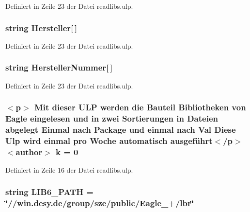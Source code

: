 Definiert in Zeile 23 der Datei readlibs.\+ulp.

\hypertarget{readlibs_8ulp_a03dd05fe151d0e9f9edf96078bc234d4}{}
\subsubsection[{Hersteller}]{\setlength{\rightskip}{0pt plus 5cm}string Hersteller\mbox{[}$\,$\mbox{]}}\label{readlibs_8ulp_a03dd05fe151d0e9f9edf96078bc234d4}


Definiert in Zeile 23 der Datei readlibs.\+ulp.

\hypertarget{readlibs_8ulp_a6ba91b18d0979e207105d660a2010d8d}{}
\subsubsection[{Hersteller\+Nummer}]{\setlength{\rightskip}{0pt plus 5cm}string Hersteller\+Nummer\mbox{[}$\,$\mbox{]}}\label{readlibs_8ulp_a6ba91b18d0979e207105d660a2010d8d}


Definiert in Zeile 23 der Datei readlibs.\+ulp.

\hypertarget{readlibs_8ulp_ac4f6835ed9b8d2035ccbb5c7c557fcfc}{}
\subsubsection[{k}]{\setlength{\rightskip}{0pt plus 5cm}$<$p$>$ Mit dieser U\+L\+P werden die Bauteil Bibliotheken von Eagle eingelesen und in zwei Sortierungen in Dateien abgelegt Einmal nach {\bf Package} und einmal nach {\bf Val} Diese Ulp wird einmal pro Woche automatisch ausgeführt$<$/p$>$$<$author$>$ k = 0}\label{readlibs_8ulp_ac4f6835ed9b8d2035ccbb5c7c557fcfc}


Definiert in Zeile 16 der Datei readlibs.\+ulp.

\hypertarget{readlibs_8ulp_a44dc1eefd5382033cf032f578a0130b9}{}
\subsubsection[{L\+I\+B6\+\_\+\+P\+A\+T\+H}]{\setlength{\rightskip}{0pt plus 5cm}string L\+I\+B6\+\_\+\+P\+A\+T\+H = \char`\"{}//win.\+desy.\+de/group/sze/public/Eagle\+\_+/lbr\char`\"{}}\label{readlibs_8ulp_a44dc1eefd5382033cf032f578a0130b9}


